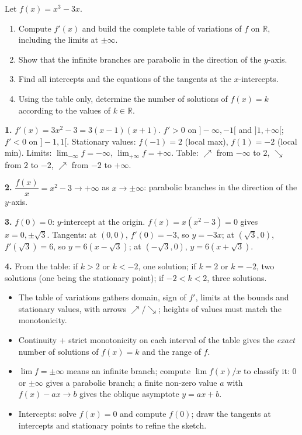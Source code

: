 \documentclass[11pt]{article}
\begin{document}
\begin{exercice}
Let $f(x)=x^{3}-3x$.
\begin{enumerate}
\item Compute $f'(x)$ and build the complete table of variations of $f$ on $\mathbb{R}$, including the limits at $\pm\infty$.
\item Show that the infinite branches are parabolic in the direction of the $y$-axis.
\item Find all intercepts and the equations of the tangents at the $x$-intercepts.
\item Using the table only, determine the number of solutions of $f(x)=k$ according to the values of $k\in\mathbb{R}$.
\end{enumerate}
\end{exercice}

\begin{corrige}[Exercise 1]
\textbf{1.} $f'(x)=3x^{2}-3=3(x-1)(x+1)$. $f'>0$ on $]-\infty,-1[$ and $]1,+\infty[$; $f'<0$ on $]-1,1[$. Stationary values: $f(-1)=2$ (local max), $f(1)=-2$ (local min). Limits: $\lim_{-\infty}f=-\infty$, $\lim_{+\infty}f=+\infty$. Table: $\nearrow$ from $-\infty$ to $2$, $\searrow$ from $2$ to $-2$, $\nearrow$ from $-2$ to $+\infty$.

\textbf{2.} $\dfrac{f(x)}{x}=x^{2}-3\to+\infty$ as $x\to\pm\infty$: parabolic branches in the direction of the $y$-axis.

\textbf{3.} $f(0)=0$: $y$-intercept at the origin. $f(x)=x(x^{2}-3)=0$ gives $x=0,\pm\sqrt{3}$. Tangents: at $(0,0)$, $f'(0)=-3$, so $y=-3x$; at $(\sqrt3,0)$, $f'(\sqrt3)=6$, so $y=6(x-\sqrt3)$; at $(-\sqrt3,0)$, $y=6(x+\sqrt3)$.

\textbf{4.} From the table: if $k>2$ or $k<-2$, one solution; if $k=2$ or $k=-2$, two solutions (one being the stationary point); if $-2<k<2$, three solutions.
\end{corrige}

\begin{aretenir}
\begin{itemize}
\item The table of variations gathers domain, sign of $f'$, limits at the bounds and stationary values, with arrows $\nearrow$/$\searrow$; heights of values must match the monotonicity.
\item Continuity + strict monotonicity on each interval of the table gives the \emph{exact} number of solutions of $f(x)=k$ and the range of $f$.
\item $\lim f=\pm\infty$ means an infinite branch; compute $\lim f(x)/x$ to classify it: $0$ or $\pm\infty$ gives a parabolic branch; a finite non-zero value $a$ with $f(x)-ax\to b$ gives the oblique asymptote $y=ax+b$.
\item Intercepts: solve $f(x)=0$ and compute $f(0)$; draw the tangents at intercepts and stationary points to refine the sketch.
\end{itemize}
\end{aretenir}
\end{document}
